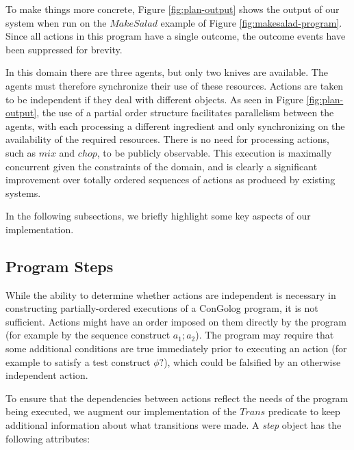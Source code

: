 To make things more concrete, Figure \ref{fig:plan-output} shows
the output of our system when run on the $MakeSalad$ example of Figure
\ref{fig:makesalad-program}. Since all actions in this program have
a single outcome, the outcome events have been suppressed for brevity.

In this domain there are three agents, but only two knives are available.
The agents must therefore synchronize their use of these resources.
Actions are taken to be independent if they deal with different objects.
As seen in Figure \ref{fig:plan-output}, the use of a partial order
structure facilitates parallelism between the agents, with each processing
a different ingredient and only synchronizing on the availability
of the required resources. There is no need for processing actions,
such as $mix$ and $chop$, to be publicly observable. This execution
is maximally concurrent given the constraints of the domain, and is
clearly a significant improvement over totally ordered sequences of
actions as produced by existing systems.

In the following subsections, we briefly highlight some key aspects
of our implementation.


\subsection{Program Steps}

While the ability to determine whether actions are independent is
necessary in constructing partially-ordered executions of a ConGolog
program, it is not sufficient. Actions might have an order imposed
on them directly by the program (for example by the sequence construct
$a_{1};a_{2}$). The program may require that some additional conditions
are true immediately prior to executing an action (for example to
satisfy a test construct $\phi?$), which could be falsified by an
otherwise independent action.

To ensure that the dependencies between actions reflect the needs
of the program being executed, we augment our implementation of the
$Trans$ predicate to keep additional information about what transitions
were made. A \emph{step} object has the following attributes:


